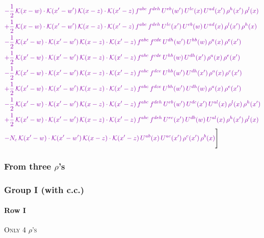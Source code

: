 \documentclass[10pt]{article}
\numberwithin{equation}{section}
\begin{document}
\begin{align}
&{\color{CC} -\frac{1}{2}\,\mathcal{K}(x-w)\cdot\mathcal{K}(x'-w')\,\mathcal{K}(x-z)\cdot\mathcal{K}(x'-z)\,f^{abc}\,f^{deh}\,U^{eb}(w')\,U^{lc}(x)\,U^{ad}(x')\,\rho^{h}(x')\,\rho^{l}(x)} \notag\\
&{\color{CC} +\frac{1}{2}\,\mathcal{K}(x-w)\cdot\mathcal{K}(x'-w')\,\mathcal{K}(x-z)\cdot\mathcal{K}(x'-z)\,f^{abc}\,f^{deh}\,U^{lc}(x')\,U^{eb}(w)\,U^{ad}(x)\,\rho^{l}(x')\,\rho^{h}(x)} \notag\\
&{\color{CC} -\frac{1}{2}\,\mathcal{K}(x'-w)\cdot\mathcal{K}(x'-w')\,\mathcal{K}(x-z)\cdot\mathcal{K}(x'-z)\,f^{abc}\,f^{cde}\,U^{dh}(w')\,U^{hb}(w)\,\rho^{a}(x)\,\rho^{e}(x')} \notag\\
&{\color{CC} +\frac{1}{2}\,\mathcal{K}(x'-w)\cdot\mathcal{K}(x'-w')\,\mathcal{K}(x-z)\cdot\mathcal{K}(x'-z)\,f^{abc}\,f^{cde}\,U^{hb}(w)\,U^{dh}(x')\,\rho^{a}(x)\,\rho^{e}(x')} \notag\\
&{\color{CC} -\frac{1}{2}\,\mathcal{K}(x'-w)\cdot\mathcal{K}(x'-w')\,\mathcal{K}(x-z)\cdot\mathcal{K}(x'-z)\,f^{abc}\,f^{dce}\,U^{hb}(w')\,U^{dh}(x')\,\rho^{a}(x)\,\rho^{e}(x')} \notag\\
&{\color{CC} +\frac{1}{2}\,\mathcal{K}(x'-w)\cdot\mathcal{K}(x'-w')\,\mathcal{K}(x-z)\cdot\mathcal{K}(x'-z)\,f^{abc}\,f^{dce}\,U^{bh}(w')\,U^{dh}(w)\,\rho^{a}(x)\,\rho^{e}(x')} \notag\\
&{\color{CC} -\frac{1}{2}\,\mathcal{K}(x'-w)\cdot\mathcal{K}(x'-w')\,\mathcal{K}(x-z)\cdot\mathcal{K}(x'-z)\,f^{abc}\,f^{deh}\,U^{eb}(w')\,U^{dc}(x')\,U^{al}(x)\,\rho^{l}(x)\,\rho^{h}(x')} \notag\\
&{\color{CC} +\frac{1}{2}\,\mathcal{K}(x'-w)\cdot\mathcal{K}(x'-w')\,\mathcal{K}(x-z)\cdot\mathcal{K}(x'-z)\,f^{abc}\,f^{deh}\,U^{ec}(x')\,U^{db}(w)\,U^{al}(x)\,\rho^{h}(x')\,\rho^{l}(x)} \notag\\
&{\color{CC} -N_{c}\,\mathcal{K}(x'-w)\cdot\mathcal{K}(x'-w')\,\mathcal{K}(x-z)\cdot\mathcal{K}(x'-z)\,U^{ab}(x)\,U^{ac}(x')\,\rho^{c}(x')\,\rho^{b}(x)}\Bigg] \end{align}
\subsubsection*{From three $\rho$'s}
\subsubsection*{Group I (with c.c.)}
\paragraph{Row I}
\textsc{Only 4 $\rho$'s}
\end{document}
